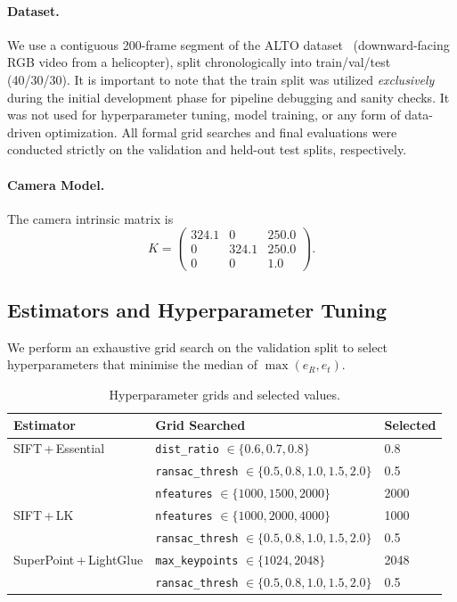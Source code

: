 \documentclass[11pt,a4paper]{article}
\begin{document}
\paragraph{Dataset.}
We use a contiguous 200-frame segment of the ALTO dataset~\cite{alto} (downward-facing RGB video from a helicopter), 
split chronologically into train/val/test (40/30/30). It is important to note that the train split was utilized 
\emph{exclusively} during the initial development phase for pipeline debugging and sanity checks. 
It was not used for hyperparameter tuning, model training, or any form of data-driven optimization. 
All formal grid searches and final evaluations were conducted strictly on the validation and held-out test splits, respectively.

\paragraph{Camera Model.}

The camera intrinsic matrix is
\[
K =
\begin{pmatrix}
324.1 & 0 & 250.0 \\
0 & 324.1 & 250.0 \\
0 & 0 & 1.0
\end{pmatrix}.
\]

\subsection{Estimators and Hyperparameter Tuning}
We perform an exhaustive grid search on the validation split to select
hyperparameters that minimise the median of $\max(e_R, e_t)$.

\begin{table}[H]
\centering
\begin{tabular}{@{}lll@{}}
\toprule
\textbf{Estimator} & \textbf{Grid Searched} & \textbf{Selected} \\
\midrule
SIFT\,+\,Essential
  & \texttt{dist\_ratio} $\in \{0.6, 0.7, 0.8\}$
  & 0.8 \\
  & \texttt{ransac\_thresh} $\in \{0.5, 0.8, 1.0, 1.5, 2.0\}$
  & 0.5 \\
  & \texttt{nfeatures} $\in \{1000, 1500, 2000\}$
  & 2000 \\[4pt]
SIFT\,+\,LK
  & \texttt{nfeatures} $\in \{1000, 2000, 4000\}$
  & 1000 \\
  & \texttt{ransac\_thresh} $\in \{0.5, 0.8, 1.0, 1.5, 2.0\}$
  & 0.5 \\[4pt]
SuperPoint\,+\,LightGlue
  & \texttt{max\_keypoints} $\in \{1024, 2048\}$
  & 2048 \\
  & \texttt{ransac\_thresh} $\in \{0.5, 0.8, 1.0, 1.5, 2.0\}$
  & 0.5 \\
\bottomrule
\end{tabular}
\caption{Hyperparameter grids and selected values.}
\label{tab:hyperparams}
\end{table}
\end{document}
